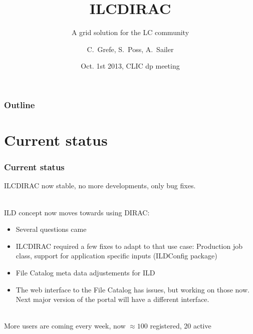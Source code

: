 \documentclass[10pt,table,dvipsnames]{beamer}
\author{C.~Grefe, S.~Poss, A.~Sailer}
\title{ILCDIRAC}
\subtitle{A grid solution for the LC community}
\date{Oct. 1st 2013, CLIC dp meeting}
\institute{CERN}
\begin{document}
\renewcommand{\inserttotalframenumber}{\ref{lastframe}}
\begin{frame}
\titlepage
\end{frame}

\begin{frame}
\frametitle{Outline}
\tableofcontents
\end{frame}

\section{Current status}
\begin{frame}
\frametitle{Current status}
ILCDIRAC now stable, no more developments, only bug fixes.

~\\

ILD concept now moves towards using DIRAC:
\begin{itemize}
\item Several questions came
\item ILCDIRAC required a few fixes to adapt to that use case: Production job class, support for application specific inputs (ILDConfig package)
\item File Catalog meta data adjustements for ILD
\item The web interface to the File Catalog has issues, but working on those now. Next major version of the portal will have a different interface.
\end{itemize}
~\\
More users are coming every week, now $\approx 100$ registered, 20 active
\end{frame}
\end{document}
